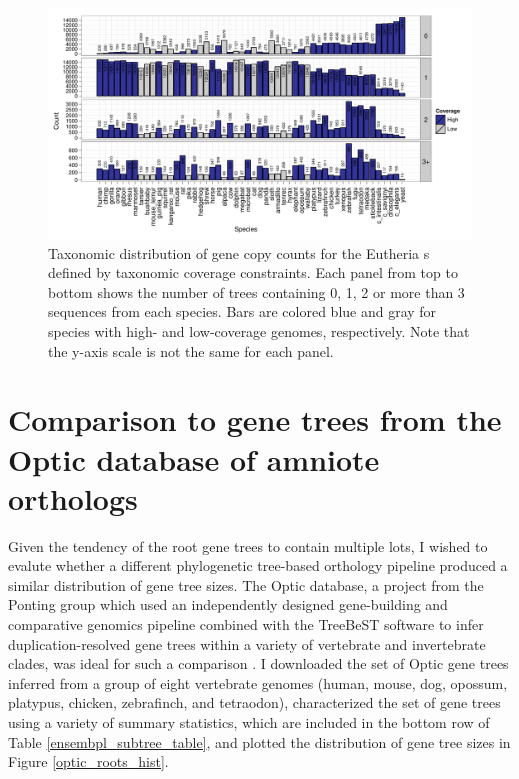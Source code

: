 \begin{landscape}
\begin{figure}
\centering
\includegraphics[scale=0.9]{Figs/ortholog_euth_dups.pdf}
\caption{Taxonomic distribution of gene copy counts for the Eutheria
  \subtr{}s defined by taxonomic coverage constraints. Each panel from
  top to bottom shows the number of trees containing 0, 1, 2 or more
  than 3 sequences from each species. Bars are colored blue and gray
  for species with high- and low-coverage genomes, respectively. Note
  that the y-axis scale is not the same for each panel.}
\label{ortholog_euth_dups}
\end{figure}
\end{landscape}

\section{Comparison to gene trees from the Optic database of amniote orthologs}

Given the tendency of the root \cmp gene trees to contain multiple
\mammln \acp{lot}, I wished to evalute whether a different
phylogenetic tree-based orthology pipeline produced a similar
distribution of gene tree sizes. The Optic database, a project from
the Ponting group which used an independently designed gene-building
and comparative genomics pipeline combined with the TreeBeST software
to infer duplication-resolved gene trees within a variety of
vertebrate and invertebrate clades, was ideal for such a comparison
\citep{Heger2008}. I downloaded the set of Optic gene trees inferred
from a group of eight vertebrate genomes (human, mouse, dog, opossum,
platypus, chicken, zebrafinch, and tetraodon), characterized the set
of gene trees using a variety of summary statistics, which are
included in the bottom row of Table \ref{ensembpl_subtree_table}, and
plotted the distribution of gene tree sizes in Figure
\ref{optic_roots_hist}.


